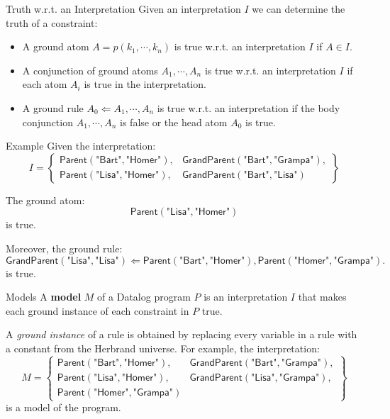 \begin{frame}{Truth w.r.t. an Interpretation}
Given an interpretation $I$ we can determine the truth of a constraint:
\begin{itemize}
    \item A ground atom $A = p(k_1, \cdots, k_n)$ is true w.r.t. an
    interpretation $I$ if $A \in I$.
    \item A conjunction of ground atoms $A_1, \cdots, A_n$ is true w.r.t. an
    interpretation $I$ if each atom $A_i$ is true in the interpretation.
    \item A ground rule $A_0 \Leftarrow A_1, \cdots, A_n$ is true w.r.t. an
    interpretation if the body conjunction $A_1, \cdots, A_n$ is false or the
    head atom $A_0$ is true.
\end{itemize}
\end{frame}

\begin{frame}{Example}
Given the interpretation:
$$
I = \left\{
\begin{array}{ll}
\textsf{Parent}(\textsf{"Bart"}, \textsf{"Homer"}),      & \textsf{GrandParent}(\textsf{"Bart"}, \textsf{"Grampa"}), \\
\textsf{Parent}(\textsf{"Lisa"}, \textsf{"Homer"}),      & \textsf{GrandParent}(\textsf{"Bart"}, \textsf{"Lisa"})
\end{array}\right\}
$$

The ground atom:
$$
\textsf{Parent}(\textsf{"Lisa"}, \textsf{"Homer"})
$$
is true.

Moreover, the ground rule:
$$
\textsf{GrandParent}(\textsf{"Lisa"}, \textsf{"Lisa"}) \Leftarrow \textsf{Parent}(\textsf{"Bart"}, \textsf{"Homer"}), \textsf{Parent}(\textsf{"Homer"}, \textsf{"Grampa"}).
$$
is true.
\end{frame}

\begin{frame}{Models}
A \textbf{model} $M$ of a Datalog program $P$ is an interpretation $I$ that
makes each ground instance of each constraint in $P$ true.

A \emph{ground instance} of a rule is obtained by replacing every variable in a
rule with a constant from the Herbrand universe. For example, the
interpretation:
$$
M = \left\{
\begin{array}{ll}
\textsf{Parent}(\textsf{"Bart"}, \textsf{"Homer"}),     & \textsf{GrandParent}(\textsf{"Bart"}, \textsf{"Grampa"}), \\
\textsf{Parent}(\textsf{"Lisa"}, \textsf{"Homer"}),     & \textsf{GrandParent}(\textsf{"Lisa"}, \textsf{"Grampa"}), \\
\textsf{Parent}(\textsf{"Homer"}, \textsf{"Grampa"})
\end{array}\right\}
$$
is a model of the program.
\end{frame}


